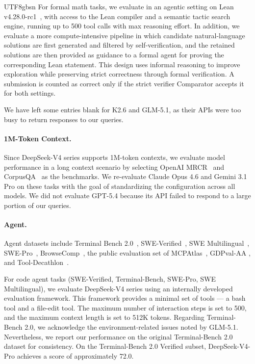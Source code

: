 \documentclass[11pt, a4paper, logo, copyright, nonumbering]{deepseek}
\newcommand{\dsviv}{DeepSeek-V4}
\newcommand{\dsvivp}{DeepSeek-V4-Pro}
\begin{document}
\begin{CJK*}{UTF8}{gbsn}
For formal math tasks, we evaluate in an agentic setting on Lean v4.28.0-rc1~\citep{moura2021lean}, with access to the Lean compiler and a semantic tactic search engine, running up to 500 tool calls with max reasoning effort. In addition, we evaluate a more compute-intensive pipeline in which candidate natural-language solutions are first generated and filtered by self-verification\citep{shao2025deepseekmathv2selfverifiablemathematicalreasoning}, and the retained solutions are then provided as guidance to a formal agent for proving the corresponding Lean statement. This design uses informal reasoning to improve exploration while preserving strict correctness through formal verification.
A submission is counted as correct only if the strict verifier Comparator accepts it for both settings. 

We have left some entries blank for K2.6 and GLM-5.1, as their APIs were too busy to return responses to our queries.

\paragraph{1M-Token Context.} 
Since \dsviv{} series supports 1M-token contexts, we evaluate model performance in a long context scenario by selecting OpenAI MRCR~\citep{mrcr} and CorpusQA~\citep{lu2026corpusqa} as the benchmarks. 
We re-evaluate Claude Opus 4.6 and Gemini 3.1 Pro on these tasks with the goal of standardizing the configuration across all models. 
We did not evaluate GPT-5.4 because its API failed to respond to a large portion of our queries.

\paragraph{Agent.} 
Agent datasets include Terminal Bench 2.0~\citep{merrill2026terminal}, SWE-Verified~\citep{swe_verified}, SWE Multilingual~\citep{yang2025swesmith}, SWE-Pro~\citep{deng2025swebenchproaiagents}, BrowseComp~\citep{wei2025browsecomp}, the public evaluation set of MCPAtlas~\citep{bandi2026mcp}, GDPval-AA \citep{patwardhan2025gdpval,gdpaa}, and Tool-Decathlon~\citep{li2025tool}. 

For code agent tasks (SWE-Verified, Terminal-Bench, SWE-Pro, SWE Multilingual), we evaluate \dsviv{} series using an internally developed evaluation framework. 
This framework provides a minimal set of tools  ---  a bash tool and a file-edit tool. 
The maximum number of interaction steps is set to 500, and the maximum context length is set to 512K tokens. 
Regarding Terminal-Bench 2.0, we acknowledge the environment-related issues noted by GLM-5.1. 
Nevertheless, we report our performance on the original Terminal-Bench 2.0 dataset for consistency. 
On the Terminal-Bench 2.0 Verified subset, \dsvivp{} achieves a score of approximately 72.0.


\end{CJK*}
\end{document}
